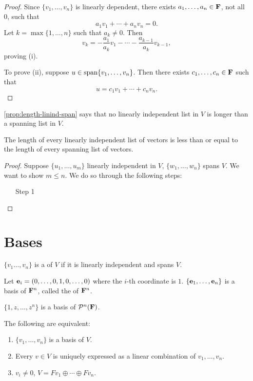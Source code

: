 \begin{proof}
Since $\{v_1,\dots,v_n\}$ is linearly dependent, there exists $a_1,\dots,a_n\in\mathbf F$, not all $0$, such that
\[a_1v_1+\cdots+a_nv_n=0.\]
Let $k=\max\{1,\dots,n\}$ such that $a_k\neq0$. Then
\[v_k=-\frac{a_1}{a_k}v_1-\cdots-\frac{a_{k-1}}{a_k}v_{k-1},\]
proving (i).

To prove (ii), suppose $u\in\operatorname{span}\{v_1,\dots,v_n\}$. Then there exists $c_1,\dots,c_n\in\mathbf F$ such that
\[u=c_1v_1+\cdots+c_nv_n.\]

\end{proof}

\cref{prop:length-linind-span} says that no linearly independent list in $V$ is longer than a spanning list in $V$.

\begin{proposition}\label{prop:length-linind-span}
The length of every linearly independent list of vectors is less than or equal to the length of every spanning list of vectors.
\end{proposition}

\begin{proof}
Suppose $\{u_1,\dots,u_m\}$ linearly independent in $V$, $\{w_1,\dots,w_n\}$ spans $V$. We want to show $m\le n$. We do so through the following steps:
\begin{itemize}
\item[Step 1] 
\end{itemize}
\end{proof}

\section{Bases}
\begin{definition}[Basis]
$\{v_1\dots,v_n\}$ is a  of $V$ if it is linearly independent and spans $V$.
\end{definition}

\begin{example}
Let $\vb{e}_i=(0,\dots,0,1,0,\dots,0)$ where the $i$-th coordinate is $1$. $\{\vb{e}_1,\dots,\vb{e}_n\}$ is a basis of $\mathbf F^n$, called the  of $\mathbf F^n$.
\end{example}

\begin{example}
$\{1,z,\dots,z^n\}$ is a basis of $\mathcal{P}^n(\mathbf F)$.
\end{example}

\begin{lemma}\label{lemma:basis-criterion}
The following are equivalent:
\begin{enumerate}[label=(\roman*)]
\item $\{v_1,\dots,v_n\}$ is a basis of $V$.
\item Every $v\in V$ is uniquely expressed as a linear combination of $v_1,\dots,v_n$.
\item $v_i\neq0$, $V=Fv_1\oplus\cdots\oplus Fv_n$.
\end{enumerate}
\end{lemma}

